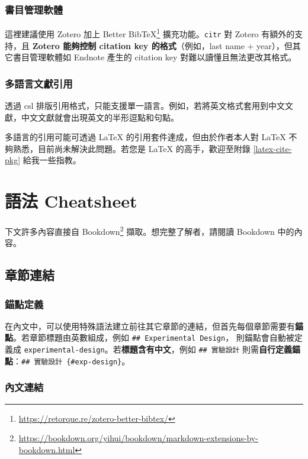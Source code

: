 \documentclass[oneside]{book}
\renewcommand{\href}[2]{#2\footnote{\url{#1}}}
\theoremstyle{definition}
\theoremstyle{definition}
\theoremstyle{definition}
\theoremstyle{remark}
\begin{document}
\subsection{書目管理軟體}\label{ref-manager}

這裡建議使用 Zotero 加上
\href{https://retorque.re/zotero-better-bibtex/}{Better BibTeX}
擴充功能。\texttt{citr} 對 Zotero 有額外的支持，且 \textbf{Zotero
能夠控制 citation key 的格式}（例如，last name +
year），但其它書目管理軟體如 Endnote 產生的 citation key
對難以讀懂且無法更改其格式。

\subsection{多語言文獻引用}\label{multi-lang-cite}

透過 csl
排版引用格式，只能支援單一語言。例如，若將英文格式套用到中文文獻，中文文獻就會出現英文的半形逗點和句點。

多語言的引用可能可透過 LaTeX 的引用套件達成，但由於作者本人對 LaTeX
不夠熟悉，目前尚未解決此問題。若您是 LaTeX 的高手，歡迎至附錄
\ref{latex-cite-pkg} 給我一些指教。

\chapter{語法 Cheatsheet}\label{cheatsheet}

下文許多內容直接自
\href{https://bookdown.org/yihui/bookdown/markdown-extensions-by-bookdown.html}{Bookdown}
擷取。想完整了解者，請閱讀 Bookdown 中的內容。

\section{章節連結}\label{chapter-cross-ref}

\subsection{錨點定義}\label{define-anchor}

在內文中，可以使用特殊語法建立前往其它章節的連結，但首先每個章節需要有\textbf{錨點}。若章節標題由英數組成，例如
\texttt{\#\#\ Experimental\ Design}， 則錨點會自動被定義成
\texttt{experimental-design}。若\textbf{標題含有中文}，例如
\texttt{\#\#\ 實驗設計}
則需\textbf{自行定義錨點}：\texttt{\#\#\ 實驗設計\ \{\#exp-design\}}。

\subsection{內文連結}
\end{document}
